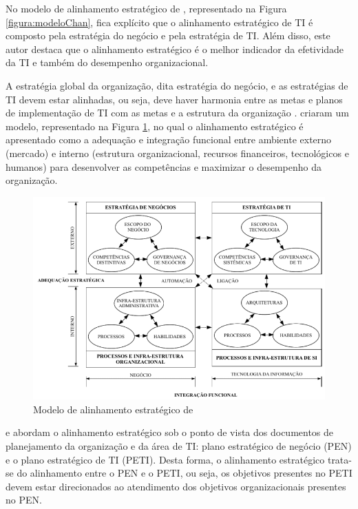 No modelo de alinhamento estratégico de , representado na Figura \ref{figura:modeloChan}, fica explícito que o alinhamento estratégico de TI é composto pela estratégia do negócio e pela estratégia de TI. Além disso, este autor destaca que o alinhamento estratégico é o melhor indicador da efetividade da TI e também do desempenho organizacional.

A estratégia global da organização, dita estratégia do negócio, e as estratégias de TI devem estar alinhadas, ou seja, deve haver harmonia entre as metas e planos de implementação de TI com as metas e a estrutura da organização \cite{luftmanetal:04}.  criaram um modelo, representado na Figura \ref{figura:modeloHenderson}, no qual o alinhamento estratégico é apresentado como a adequação e integração funcional entre ambiente externo (mercado) e interno (estrutura organizacional, recursos financeiros, tecnológicos e humanos) para desenvolver as competências e maximizar o desempenho da organização. 

\begin{figure}[h!]
\centering %
\includegraphics[width=14cm]{figuras/modeloHenderson.png}
\caption{Modelo de alinhamento estratégico de }
\label{figura:modeloHenderson}
\end{figure}

 e  abordam o alinhamento estratégico sob o ponto de vista dos documentos de planejamento da organização e da área de TI: plano estratégico de negócio (PEN) e o plano estratégico de TI (PETI). Desta forma, o alinhamento estratégico trata-se do alinhamento entre o PEN e o PETI, ou seja, os objetivos presentes no PETI devem estar direcionados ao atendimento dos objetivos organizacionais presentes no PEN.

